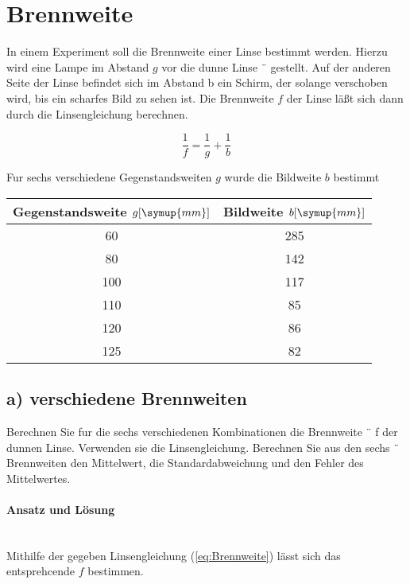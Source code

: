 \section{Brennweite}
In einem Experiment soll die Brennweite einer Linse bestimmt werden. Hierzu
wird eine Lampe im Abstand $g$ vor die dunne Linse ¨ gestellt. Auf der anderen
Seite der Linse befindet sich im Abstand b ein Schirm, der solange verschoben
wird, bis ein scharfes Bild zu sehen ist. Die Brennweite $f$ der Linse läßt sich dann
durch die Linsengleichung berechnen.

\begin{equation}
    \label{eq:Brennweite}
        \frac{1}{f}=\frac{1}{g} + \frac{1}{b}
\end{equation}


Fur sechs verschiedene Gegenstandsweiten $g$ wurde die Bildweite $b$ bestimmt

\begin{table}
\centering
\label{tab:lösunga}
\begin{tabular}{c c}
    Gegenstandsweite $g [\symup{mm}]$ & Bildweite $b [\symup{mm}]$\\
    \midrule
    60 &285 \\
    80 &142 \\
    100& 117\\
    110& 85 \\
    120& 86 \\
    125& 82 \\
    \bottomrule
\end{tabular}
\end{table}

\subsection{a) verschiedene Brennweiten}
 Berechnen Sie fur die sechs verschiedenen Kombinationen die Brennweite ¨ f der
dunnen Linse. Verwenden sie die Linsengleichung. Berechnen Sie aus den sechs ¨
Brennweiten den Mittelwert, die Standardabweichung und den Fehler des Mittelwertes.

\paragraph{Ansatz und Lösung} \mbox{} \\
Mithilfe der gegeben Linsengleichung (\ref{eq:Brennweite}) lässt sich das entsprehcende $f$ bestimmen.

